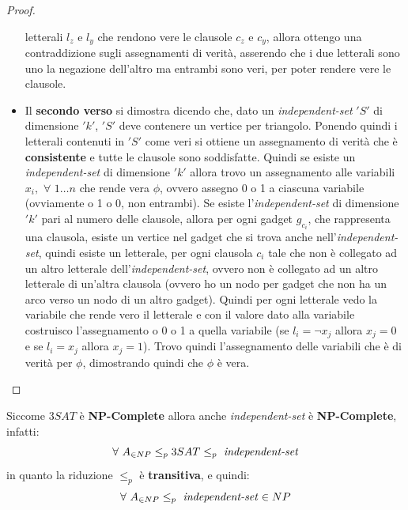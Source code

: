 \begin{proof}
\begin{itemize}
									      letterali $l_z$ e $l_y$ che rendono vere le clausole $c_z$ e $c_y$,
									      allora ottengo una contraddizione sugli assegnamenti di verità, asserendo
									      che i due letterali sono uno la negazione dell'altro ma entrambi sono
									      veri, per poter rendere vere le clausole. 
									\item  Il \textbf{secondo verso} si dimostra dicendo che, dato un
									      \textit{independent-set} 
									      $ 'S' $ di dimensione $ 'k' $, $ 'S' $ deve contenere un vertice per triangolo. Ponendo
									      quindi i letterali contenuti in $ 'S' $ come veri si ottiene un assegnamento di
									      verità che è \textbf{consistente} e tutte le clausole sono soddisfatte.
									      Quindi se esiste un \textit{independent-set} di dimensione $ 'k' $ allora trovo
									      un assegnamento alle variabili $x_i,\,\,\forall \,\,1\ldots n$ che rende
									      vera $\phi$, ovvero assegno 0 o 1 a ciascuna variabile (ovviamente o 1 o 0,
									      non entrambi). Se esiste l'\textit{independent-set} di dimensione $ 'k' $ pari
									      al numero delle clausole, allora per ogni gadget $g_{c_i}$,
									      che rappresenta una clausola, esiste un vertice nel gadget che si trova
									      anche nell'\textit{independent-set}, quindi esiste un letterale, per ogni
									      clausola $c_i$ tale che non è collegato ad un altro letterale
									      dell'\textit{independent-set}, ovvero non è collegato ad un altro letterale
									      di un'altra clausola (ovvero ho un nodo per gadget che non ha un arco verso
									      un nodo di un altro gadget). Quindi per ogni letterale vedo la variabile che
									      rende vero il letterale e con il valore dato alla variabile costruisco
									      l'assegnamento o 0 o 1 a quella variabile (se $l_i=\neg x_j$ allora
									      $x_j=0$ e se $l_i= x_j$ allora $x_j=1$). Trovo quindi l'assegnamento delle
									      variabili che è di verità per $\phi$, dimostrando quindi che $\phi$ è vera.
								\end{itemize}
							\end{proof}
							Siccome $3SAT$ è \textbf{NP-Complete} allora anche \textit{independent-set} è
							\textbf{NP-Complete}, infatti:
							\[\forall\,\, A_{\in NP}\leq_p 3SAT\leq_p \mbox{ \textit{independent-set}}\]
							in quanto la riduzione $\leq_p$ è \textbf{transitiva}, e quindi:
							\[\forall\,\, A_{\in NP}\leq_p \mbox{ \textit{independent-set}}\in NP\]
